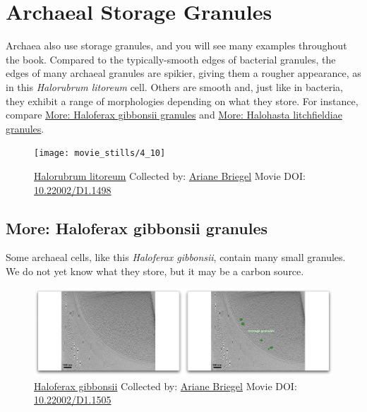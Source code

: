 \documentclass[]{tufte-book}
\begin{document}
\section{Archaeal Storage Granules}\label{archaeal-storage-granules}

Archaea also use storage granules, and you will see many examples
throughout the book. Compared to the typically-smooth edges of bacterial
granules, the edges of many archaeal granules are spikier, giving them a
rougher appearance, as in this \emph{Halorubrum litoreum} cell. Others
are smooth and, just like in bacteria, they exhibit a range of
morphologies depending on what they store. For instance, compare
\protect\hyperlink{Haloferax_gibbonsii_granules}{More: Haloferax
gibbonsii granules} and
\protect\hyperlink{Halohasta_litchfieldiae_granules}{More: Halohasta
litchfieldiae granules}.





\begin{figure}
\texttt{[image: movie\_stills/4\_10]} \caption[\protect\hyperlink{tree}{Halorubrum litoreum} Collected by:
\protect\hyperlink{ariane_briegel}{Ariane Briegel} Movie DOI:
\href{https://doi.org/10.22002/D1.1498}{10.22002/D1.1498}]{\protect\hyperlink{tree}{Halorubrum litoreum} Collected by:
\protect\hyperlink{ariane_briegel}{Ariane Briegel} Movie DOI:
\href{https://doi.org/10.22002/D1.1498}{10.22002/D1.1498}}\label{fig:4-10}
\end{figure}

\hypertarget{Haloferax_gibbonsii_granules}{\subsection*{More: Haloferax
gibbonsii granules}\label{Haloferax_gibbonsii_granules}}

Some archaeal cells, like this \emph{Haloferax gibbonsii}, contain many
small granules. We do not yet know what they store, but it may be a
carbon source.





\begin{figure}
\includegraphics{movie_stills/4_10a} \caption[\protect\hyperlink{tree}{Haloferax gibbonsii} Collected by:
\protect\hyperlink{ariane_briegel}{Ariane Briegel} Movie DOI:
\href{https://doi.org/10.22002/D1.1505}{10.22002/D1.1505}]{\protect\hyperlink{tree}{Haloferax gibbonsii} Collected by:
\protect\hyperlink{ariane_briegel}{Ariane Briegel} Movie DOI:
\href{https://doi.org/10.22002/D1.1505}{10.22002/D1.1505}}\label{fig:4-10a}
\end{figure}
\end{document}
